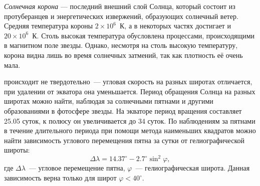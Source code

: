 \textit{Солнечная корона} --- последний внешний слой Солнца, который состоит из протуберанцев и энергетических  извержений, образующих солнечный ветер. Средняя температура короны $2 \times 10^6$~К, а в некоторых частях достигает  и $20\times10^6$~К. Столь высокая температура обусловлена процессами, происходящими в магнитном поле звезды. Однако, несмотря на столь высокую температуру, корона видна лишь во время солнечных затмений, так как плотность её очень мала.
  
 происходит не твердотельно~--- угловая скорость на разных широтах отличается, при удалении от экватора она уменьшается. Период обращения Солнца на разных широтах можно найти, наблюдая за солнечными пятнами и другими образованиями в фотосфере звезды. На экваторе период вращения составляет 25.05 суток, к полюсу он увеличивается до 34 суток. По наблюдениям за пятнами в течение длительного периода при помощи метода наименьших квадратов можно найти зависимость углового перемещения пятна за сутки от гелиографической широты:
\begin{equation}
\Delta\lambda=14.37^{\circ}-2.7^{\circ}\sin^2\varphi,
\end{equation}
где $\Delta\lambda$~--- угловое перемещение пятна, $\varphi$~--- гелиографическая широта. Данная зависимость верна только для широт $\varphi < 40^\circ$.